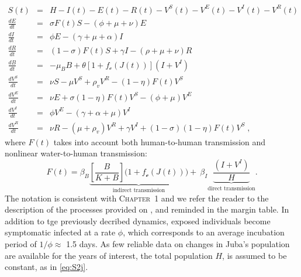 \begingroup
\allowdisplaybreaks
\begin{eqnarray} \label{eq:fullmodel}
S(t) &=& H - I(t) - E(t) - R(t) - V^S(t) - V^E(t) - V^I(t) - V^R(t) \label{eq:S2j} \\
 \frac{dE}{dt} &=& \sigma F(t) S - (\phi + \mu +\nu) E \label{eq:E2j}\\
 \frac{dI}{dt} &=& \phi E - (\gamma + \mu + \alpha) I \label{eq:I2j}\\
 \frac{dR}{dt} &=& (1-\sigma) F(t) S + \gamma I - (\rho + \mu+\nu) R \label{eq:R2j}\\
 \frac{dB}{dt} &=& - \mu_B B +\theta\left[1 + f_{\mathcal{c}}\left(J(t)\right) \right] (I+V^I)\label{eq:B2}\\
\frac{dV^S}{dt} &=& \nu S - \mu V^S+ \rho_{v} V^R - (1-\eta) F(t) V^S \label{eq:VS2j}\\
 \frac{dV^E}{dt} &=& \nu E + \sigma (1-\eta) F(t) V^S-(\phi + \mu) V^E \label{eq:VE2}\\
 \frac{dV^I}{dt} &=&  \phi V^E -(\gamma + \alpha + \mu) V^I \label{eq:VI2j}\\
 \frac{dV^R}{dt} &=& \nu R -(\mu +\rho_{v})V^R +\gamma V^I +(1-\sigma) (1-\eta) F(t) V^S\label{eq:VR2j}\; ,
\end{eqnarray}
\endgroup
where $F(t)$ takes into account both human-to-human transmission and nonlinear water-to-human transmission:
\begin{equation}
  F(t) = \beta_B \underbrace{ \left[\frac{B}{K + B} \right] \bigg(1+f_{\mathcal{e}}\left(J(t)\right)\bigg)}_{\text{indirect transmission}} + ~\beta_{I} \underbrace{\frac{(I+V^I)}{H}}_{\text{direct transmission}}.
\label{eq:force2}
\end{equation}
 The notation is consistent with \textsc{Chapter~1} and we refer the reader to the description of the processes provided on \pageref{eq:I2}, and reminded in the margin table. In addition to tge previously decribed dynamics, exposed individuals become symptomatic infected at a rate $\phi$, which corresponds to an average incubation period of $1/\phi\approx$ 1.5 days\cite{Azman:IncubationPeriodCholera:2013}. As few reliable data on changes in Juba's population are available for the years of interest, the total population $H$, is assumed to be constant, as in \eqref{eq:S2j}. 
 
